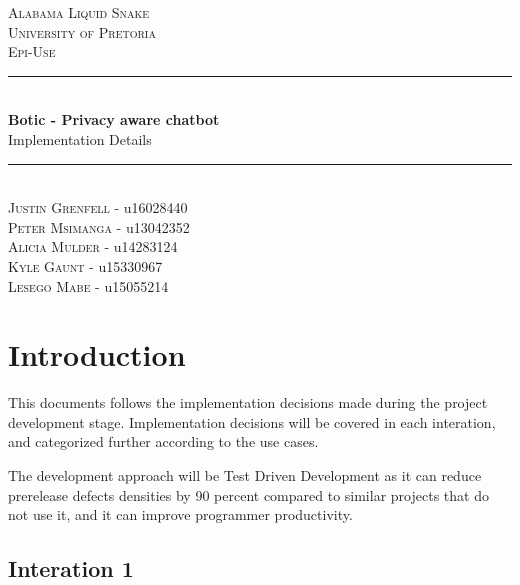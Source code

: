 \documentclass[11pt]{article}
\begin{document}
\renewcommand{\familydefault}{\sfdefault}
\begin{titlepage}
	\newcommand{\HRule}{\rule{\linewidth}{0.5mm}}
	\begin{center}
		            
		\textsc{\LARGE Alabama Liquid Snake}\\[0.8cm]
		\textsc{\Large University of Pretoria}\\[0.5cm]
		\textsc{\large Epi-Use}\\[0.5cm]
		    
		\HRule\\[0.4cm]
		    	
		{\huge\bfseries Botic - Privacy aware chatbot}\\[0.2cm]
		    	
		{\huge Implementation Details}\\[0.2cm]
		
		\HRule\\[0.5cm]
		
		\textsc{Justin Grenfell} - u16028440 \\[0cm]
		\textsc{Peter Msimanga} - u13042352 \\[0cm]
		\textsc{Alicia Mulder} - u14283124 \\[0cm]
		\textsc{Kyle Gaunt} - u15330967 \\[0cm]
		\textsc{Lesego Mabe} - u15055214 \\[0cm]
		    
	\end{center}
\end{titlepage}
\tableofcontents
\newpage

\section{Introduction}

This documents follows the implementation decisions made during the project development stage. Implementation decisions will be covered in each interation, and categorized further according to the use cases.\par
The development approach will be Test Driven Development as it can reduce prerelease defects densities by 90 percent compared to similar projects that do not use it, and it can improve programmer productivity\cite{Book:1}.

\subsection{Interation 1}
\end{document}
